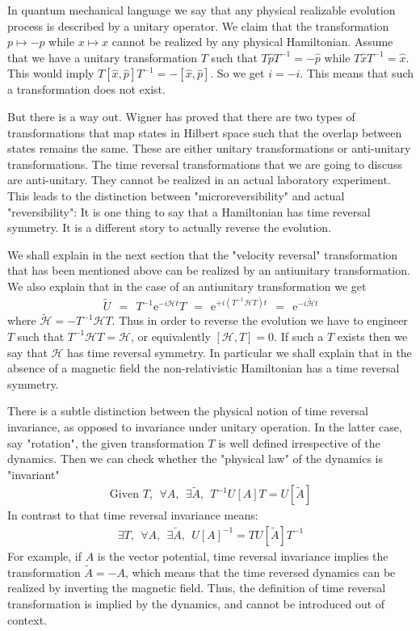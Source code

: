 \documentclass[onecolumn,fleqn]{revtex4}
\newcommand{\eexp}{\mathrm{e}^}
\newcommand{\beq}{\begin{eqnarray}}
\newcommand{\eeq}{\end{eqnarray}}
\begin{document}
In quantum mechanical language we say that any physical 
realizable evolution process is described 
by a unitary operator.
We claim that the transformation 
$p \mapsto -p$ while $x \mapsto x$ cannot be realized 
by any physical Hamiltonian. 
Assume that we have a unitary transformation $T$ 
such that $T\hat{p}T^{-1} = -\hat{p}$ while  $T\hat{x}T^{-1}=\hat{x}$. 
This would imply $T [\hat{x},\hat{p}] T^{-1}  = - [\hat{x},\hat{p}]$. 
So we get $i=-i$. This means that such a transformation 
does not exist.  

But there is a way out. Wigner 
has proved that there are two types of transformations 
that map states in Hilbert space such that the overlap 
between states remains the same. These are 
either unitary transformations or anti-unitary transformations.
The time reversal transformations that we are going to 
discuss are anti-unitary.  
They cannot be realized in an actual laboratory experiment. 
This leads to the distinction between "microreversibility" 
and actual "reversibility": It is one thing to say 
that a Hamiltonian has time reversal symmetry. 
It is a different story to actually reverse the evolution.  

We shall explain in the next section that 
the "velocity reversal" transformation 
that has been mentioned above can be 
realized by an antiunitary transformation. 
We also explain that in the case of an 
antiunitary transformation we get
\beq
\tilde{U} \ \ = \ \ T^{-1} \eexp{-i\mathcal{H}t} T \ \ = \ \  \eexp{+i (T^{-1} \mathcal{H} T) t} \ \ = \ \ \eexp{-i\tilde{\mathcal{H}}t}
\eeq
where $\tilde{\mathcal{H}} = -T^{-1} \mathcal{H} T$. Thus in order 
to reverse the evolution we have to engineer $T$ 
such that $T^{-1} \mathcal{H} T = \mathcal{H}$, or equivalently 
$[\mathcal{H},T]=0$. If such a $T$ exists then we say that $\mathcal{H}$ 
has time reversal symmetry. In particular we shall explain 
that in the absence of a magnetic field the 
non-relativistic Hamiltonian has a time reversal symmetry.

There is a subtle distinction between the physical notion 
of time reversal invariance, as opposed to invariance under unitary operation.
In the latter case, say "rotation", the given transformation $T$ is well defined 
irrespective of the dynamics. Then we can check whether the "physical law" 
of the dynamics is "invariant"  
\beq
\mbox{Given $T$}, \ \ \forall A, \ \ \exists \tilde{A}, \ \ T^{-1}U[A]T = U[\tilde{A}] 
\eeq
In contrast to that time reversal invariance means:
\beq
\exists T, \ \ \forall A, \ \ \exists \tilde{A}, \ \  U[A]^{-1} =  T U[\tilde{A}] T^{-1}  
\eeq
For example, if $A$ is the vector potential, time reversal invariance 
implies the transformation ${\tilde{A}=-A}$, which means that 
the time reversed dynamics can be realized by inverting the magnetic field.   
Thus, the definition of time reversal transformation is implied by the dynamics, 
and cannot be introduced out of context.   
 
\end{document}
